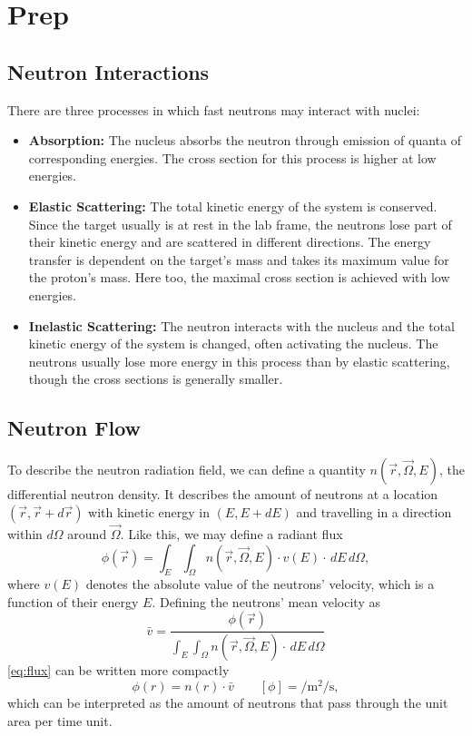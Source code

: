\setcounter{chapter}{-1}
\chapter{Prep}
\section{Neutron Interactions}\label{sec:inter}
There are three processes in which fast neutrons may interact with nuclei:
\begin{itemize}
	\item \textbf{Absorption:} The nucleus absorbs the neutron through emission of quanta of corresponding energies.
	The cross section for this process is higher at low energies.
	\item \textbf{Elastic Scattering:} The total kinetic energy of the system is conserved.
	Since the target usually is at rest in the lab frame, the neutrons lose part of their kinetic energy and are scattered in different directions.
	The energy transfer is dependent on the target's mass and takes its maximum value for the proton's mass.
	Here too, the maximal cross section is achieved with low energies.
	\item \textbf{Inelastic Scattering:} The neutron interacts with the nucleus and the total kinetic energy of the system is changed, often activating the nucleus.
	The neutrons usually lose more energy in this process than by elastic scattering, though the cross sections is generally smaller.
\end{itemize}

\section{Neutron Flow}\label{sec:flow}
To describe the neutron radiation field, we can define a quantity $n(\vec{r}, \vec{\Omega}, E)$, the differential neutron density.
It describes the amount of neutrons at a location $(\vec{r}, \vec{r} + d\vec{r})$ with kinetic energy in $(E, E+dE)$ and travelling in a direction within $d\Omega$ around $\vec{\Omega}$.
Like this, we may define a radiant flux
\begin{equation}\label{eq:flux}
	\phi(\vec{r}) = \int_E \int_\Omega n(\vec{r}, \vec{\Omega}, E)\cdot v(E)\cdot \,dE \,d\Omega,
\end{equation}
where $v(E)$ denotes the absolute value of the neutrons' velocity, which is a function of their energy $E$.
Defining the neutrons' mean velocity as
\begin{equation*}
	\bar{v} = \frac{\phi(\vec{r})}{\int_E \int_\Omega n(\vec{r}, \vec{\Omega}, E)\cdot \,dE \,d\Omega}
\end{equation*}
\autoref{eq:flux} can be written more compactly
\begin{equation*}
	\phi(r) = n(r)\cdot \bar{v} \qquad \left[\phi\right]=\si{\per\meter\squared\per\second},
\end{equation*}
which can be interpreted as the amount of neutrons that pass through the unit area per time unit.

